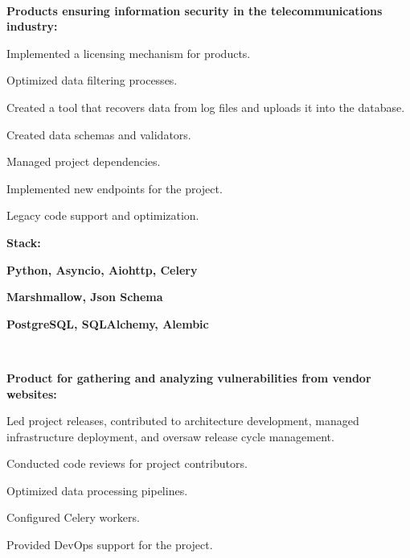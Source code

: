 \documentclass[a4paper]{MagicalCV}
\begin{document}
\begin{minipage}[t]{0.64\textwidth} 


 \\
\vspace{\topsep} %

\textbf{Products ensuring information security in the telecommunications industry:}
\begin{tightemize}
  \item Implemented a licensing mechanism for products.
  \item Optimized data filtering processes.
  \item Created a tool that recovers data from log files and uploads it into the database.
  \item Created data schemas and validators.
  \item Managed project dependencies.
  \item Implemented new endpoints for the project.
  \item Legacy code support and optimization.  
\end{tightemize}

\textbf{Stack:}
\begin{tightemize}
  \item \textbf{Python, Asyncio, Aiohttp, Celery}
  \item \textbf{Marshmallow, Json Schema}
  \item \textbf{PostgreSQL, SQLAlchemy, Alembic}
\end{tightemize}
\sectionsep

 \\
\vspace{\topsep} %


\textbf{Product for gathering and analyzing vulnerabilities from vendor websites:}

\begin{tightemize}
  \item Led project releases, contributed to architecture development, managed infrastructure deployment, and oversaw release cycle management.
  \item Conducted code reviews for project contributors.
  \item Optimized data processing pipelines.
  \item Configured Celery workers.
  \item Provided DevOps support for the project.  
\end{tightemize}


\end{minipage}
\end{document}
